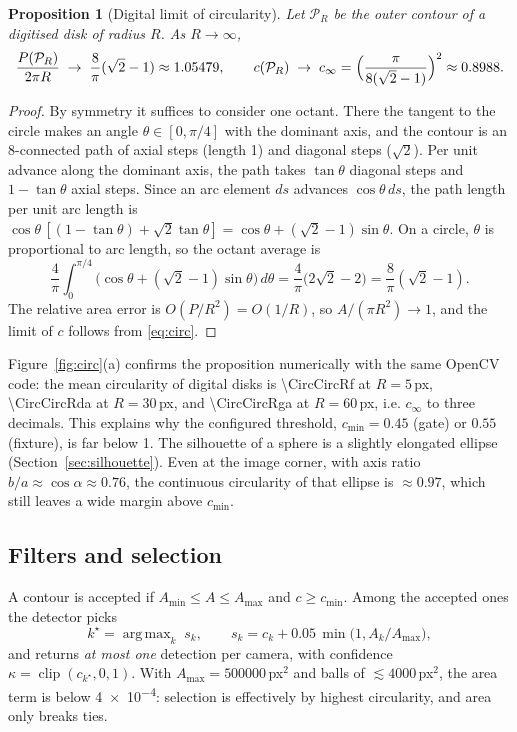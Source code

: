 \documentclass[11pt,a4paper]{article}
\newtheorem{proposition}{Proposition}
\theoremstyle{definition}
\theoremstyle{remark}
\DeclareMathOperator*{\argmax}{arg\,max}
\begin{document}
\begin{proposition}[Digital limit of circularity]
\label{prop:circ-digital}
Let $\mathcal P_R$ be the outer contour of a digitised disk of radius $R$. As
$R\to\infty$,
\begin{equation}
\frac{P(\mathcal P_R)}{2\pi R}\;\to\;\frac{8}{\pi}(\sqrt2-1)\approx1.05479,
\qquad
c(\mathcal P_R)\;\to\;c_\infty=\Bigl(\frac{\pi}{8(\sqrt2-1)}\Bigr)^2\approx0.8988.
\end{equation}
\end{proposition}
\begin{proof}
By symmetry it suffices to consider one octant. There the tangent to the
circle makes an angle $\theta\in[0,\pi/4]$ with the dominant axis, and the
contour is an 8-connected path of axial steps (length 1) and diagonal steps
($\sqrt2$). Per unit advance along the dominant axis, the path takes
$\tan\theta$ diagonal steps and $1-\tan\theta$ axial steps. Since an arc
element $ds$ advances $\cos\theta\,ds$, the path length per unit arc length is
$\cos\theta\,[(1-\tan\theta)+\sqrt2\tan\theta]=\cos\theta+(\sqrt2-1)\sin\theta$.
On a circle, $\theta$ is proportional to arc length, so the octant average is
\[
\frac{4}{\pi}\int_0^{\pi/4}\bigl(\cos\theta+(\sqrt2-1)\sin\theta\bigr)\,d\theta
=\frac4\pi\bigl(2\sqrt2-2\bigr)=\frac{8}{\pi}(\sqrt2-1).
\]
The relative area error is $O(P/R^2)=O(1/R)$, so $A/(\pi R^2)\to1$, and the
limit of $c$ follows from \eqref{eq:circ}.
\end{proof}

Figure~\ref{fig:circ}(a) confirms the proposition numerically with the same
OpenCV code: the mean circularity of digital disks is \num{\CircCircRf} at
$R=5$\,px, \num{\CircCircRda} at $R=30$\,px, and \num{\CircCircRga} at
$R=60$\,px, i.e. $c_\infty$ to three decimals. This explains why the configured
threshold, $c_{\min}=0.45$ (gate) or $0.55$ (fixture), is far below 1. The
silhouette of a sphere is a slightly elongated ellipse
(Section~\ref{sec:silhouette}). Even at the image corner, with axis ratio
$b/a\approx\cos\alpha\approx0.76$, the continuous circularity of that ellipse
is $\approx0.97$, which still leaves a wide margin above $c_{\min}$.

\subsection{Filters and selection}

A contour is accepted if $A_{\min}\leq A\leq A_{\max}$ and $c\geq c_{\min}$.
Among the accepted ones the detector picks
\begin{equation}
k^\star=\argmax_k\; s_k,\qquad s_k=c_k+0.05\,\min\bigl(1,A_k/A_{\max}\bigr),
\label{eq:score}
\end{equation}
and returns \emph{at most one} detection per camera, with confidence
$\kappa=\operatorname{clip}(c_{k^\star},0,1)$. With
$A_{\max}=\num{500000}$\,px$^2$ and balls of $\lesssim\num{4000}$\,px$^2$, the area
term is below \num{4e-4}: selection is effectively by highest circularity,
and area only breaks ties.
\end{document}
